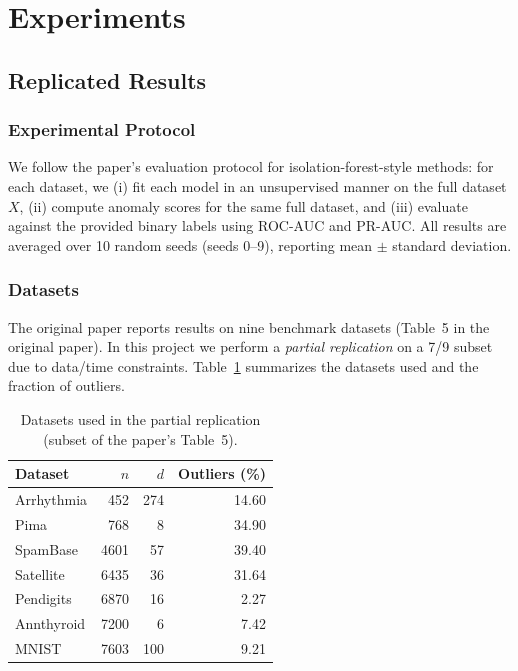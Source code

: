 \section{Experiments}
\label{sec:experiments}

\subsection{Replicated Results}
\label{sec:replication}

\subsubsection{Experimental Protocol}
We follow the paper's evaluation protocol for isolation-forest-style methods: for each dataset, we (i) fit each model in an unsupervised manner on the full dataset $X$, (ii) compute anomaly scores for the same full dataset, and (iii) evaluate against the provided binary labels using ROC-AUC and PR-AUC.
All results are averaged over 10 random seeds (seeds 0--9), reporting mean $\pm$ standard deviation.

\subsubsection{Datasets}
The original paper reports results on nine benchmark datasets (Table~5 in the original paper). In this project we perform a \emph{partial replication} on a 7/9 subset due to data/time constraints. Table~\ref{tab:datasets-summary} summarizes the datasets used and the fraction of outliers.

\begin{table}[t]
\centering
\caption{Datasets used in the partial replication (subset of the paper's Table~5).}
\label{tab:datasets-summary}
\small
\setlength{\tabcolsep}{6pt}
\begin{tabular}{lrrr}
\toprule
Dataset & $n$ & $d$ & Outliers (\%) \\
\midrule
Arrhythmia & 452  & 274 & 14.60 \\
Pima       & 768  & 8   & 34.90 \\
SpamBase   & 4601 & 57  & 39.40 \\
Satellite  & 6435 & 36  & 31.64 \\
Pendigits  & 6870 & 16  & 2.27 \\
Annthyroid & 7200 & 6   & 7.42 \\
MNIST      & 7603 & 100 & 9.21 \\
\bottomrule
\end{tabular}
\end{table}

